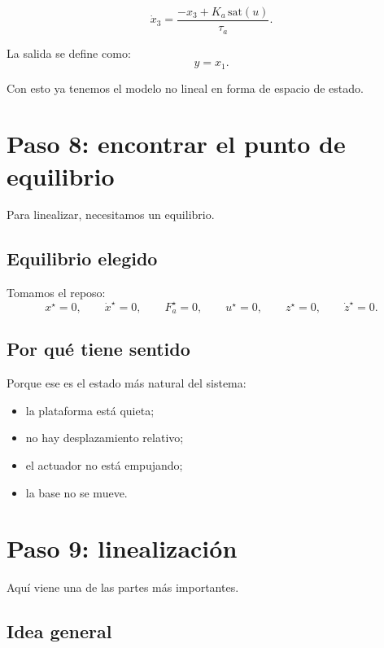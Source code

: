 \documentclass[11pt]{article}
\begin{document}
\begin{equation}
\dot{x}_3 =
\frac{-x_3 + K_a\,\mathrm{sat}(u)}{\tau_a}.
\label{eq:state3}
\end{equation}

La salida se define como:
\begin{equation}
y = x_1.
\label{eq:output}
\end{equation}

Con esto ya tenemos el modelo no lineal en forma de espacio de estado.

\section{Paso 8: encontrar el punto de equilibrio}

Para linealizar, necesitamos un equilibrio.

\subsection{Equilibrio elegido}

Tomamos el reposo:
\begin{equation}
x^\star = 0,\qquad
\dot{x}^\star = 0,\qquad
F_a^\star = 0,\qquad
u^\star = 0,\qquad
z^\star = 0,\qquad
\dot{z}^\star = 0.
\end{equation}

\subsection{Por qu\'e tiene sentido}

Porque ese es el estado m\'as natural del sistema:

\begin{itemize}[leftmargin=1.2cm]
\item la plataforma est\'a quieta;
\item no hay desplazamiento relativo;
\item el actuador no est\'a empujando;
\item la base no se mueve.
\end{itemize}

\section{Paso 9: linealizaci\'on}

Aqu\'i viene una de las partes m\'as importantes.

\subsection{Idea general}
\end{document}
